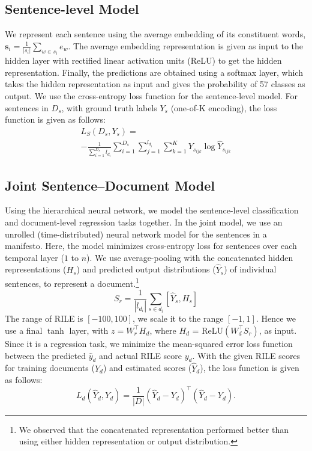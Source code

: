 \documentclass[11pt,a4paper]{article}
\begin{document}
\subsection{Sentence-level Model}
We represent each sentence using the average embedding of its constituent words, $ \bm{s}_{i} = \frac{1}{|s_{i}|}\sum_{w \in s_{i}} e_{w}$.
The average embedding representation is given as input to the hidden layer with rectified linear activation units (ReLU) to get the hidden representation. Finally, the predictions are obtained using a softmax layer, which takes the hidden representation as input and gives the probability of 57 classes as output.
We use the cross-entropy loss function for the sentence-level model. For sentences in $D_{s}$, with ground truth labels $Y_{s}$ (one-of-K encoding), the loss function is given as follows:
  \begin{multline}
    \label{eq:sent-loss}
    L_{S}(D_{s},Y_{s})= \\
    -\frac{1}{\sum_{i=1}^{D_{s}}l_{d_{i}}}\sum_{i=1}^{D_{s}}\sum_{j=1}^{l_{d_{i}}}\sum_{k=1}^{K} Y_{s_{ijk}} \log \hat{Y}_{s_{ijk}}  
  \end{multline}

\subsection{Joint Sentence--Document Model}
Using the hierarchical neural network, we model the sentence-level classification and document-level regression tasks together. In the joint model, we use an unrolled (time-distributed) neural network model for the sentences in a manifesto. Here, the model minimizes cross-entropy loss for sentences over each temporal layer ($1$ to $n$). We use average-pooling with the concatenated hidden representations ($H_{s}$) and predicted output distributions ($\hat{Y}_{s}$) of individual sentences, to represent a document.\footnote{We observed that the concatenated representation performed better than using either hidden representation or output distribution.}
\begin{equation}
 S_{r} = \frac{1}{|l_{d_{i}}|}\sum_{s \in d_{i}} [\hat{Y}_{s}, H_{s}] 
\end{equation}
The range of RILE is $[-100,100]$, we scale it to the range $[-1,1]$. Hence we use a final $\tanh$ layer, with $z = W_{r}^\top H_{d}$, where $H_{d}$ = ReLU$(W_{d}^\top S_{r})$, as input.
Since it is a regression task, we minimize the mean-squared error loss function between the predicted $\hat{y}_{d}$ and actual RILE score $y_{d}$. With the given RILE scores for training documents ($Y_{d}$) and estimated scores ($\hat{Y}_{d}$), the loss function is given as follows:
\begin{equation}
L_{d}(\hat{Y}_{d}, Y_{d}) = \frac{1}{|D|}  (\hat{Y}_{d} - Y_{d})^\top (\hat{Y}_{d} - Y_{d}).
\label{eq:doc-loss}
\end{equation}
\end{document}
